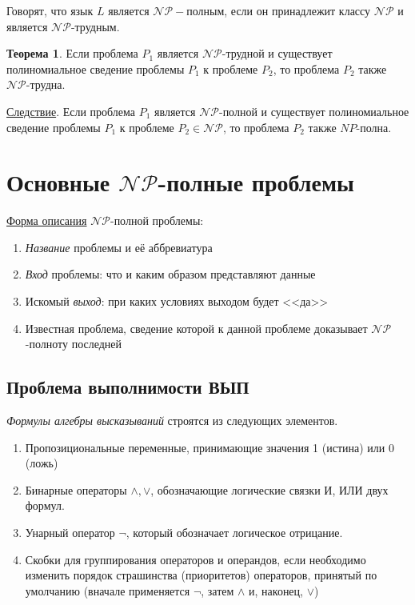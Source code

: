 \dftion Говорят, что язык $L$ является $\mathscr{NP}-\textbf{полным}$, если он принадлежит классу $\mathscr{NP}$ и является $\mathscr{NP}\text{-трудным}$.

\textbf{Теорема 1}. Если проблема $P_1$ является $\mathscr{NP}$-трудной и существует полиномиальное сведение проблемы $P_1$ к проблеме $P_2$, то проблема $P_2$ также $\mathscr{NP}$-трудна.

\underline{Следствие}. Если проблема $P_1$ является $\mathscr{NP}$-полной и существует полиномиальное сведение проблемы $P_1$ к проблеме $P_2 \in \mathscr{NP}$, то проблема $P_2$ также $NP$-полна.

\section{Основные $\mathscr{NP}$-полные проблемы}
\underline{Форма описания} $\mathscr{NP}$-полной проблемы:

\begin{enumerate}
    \item \textit{Название} проблемы и её аббревиатура
    \item \textit{Вход} проблемы: что и каким образом представляют данные
    \item Искомый \textit{выход}: при каких условиях выходом будет <<да>>
    \item Известная проблема, сведение которой к данной проблеме доказывает $\mathscr{NP}$-полноту последней
\end{enumerate}

\subsection{Проблема выполнимости ВЫП}
\textit{Формулы алгебры высказываний} строятся из следующих элементов.

\begin{enumerate}
    \item Пропозициональные переменные, принимающие значения 1 (истина) или 0 (ложь)
    \item Бинарные операторы $\land, \lor$, обозначающие логические связки И, ИЛИ двух формул.
    \item Унарный оператор $\lnot$, который обозначает логическое отрицание.
    \item Скобки для группирования операторов и операндов, если необходимо изменить порядок страшинства (приоритетов) операторов, принятый по умолчанию (вначале применяется $\lnot$, затем $\land$ и, наконец, $\lor$)
\end{enumerate}

